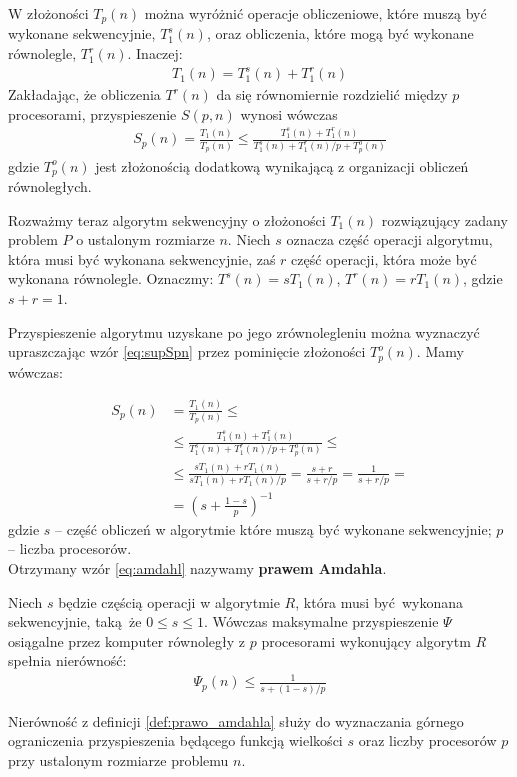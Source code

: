 W złożoności \(T_{p}(n)\) można wyróżnić operacje obliczeniowe, które muszą być wykonane sekwencyjnie, \(T^{s}_{1}(n)\), oraz obliczenia, które mogą być wykonane równolegle, \(T^{r}_{1}(n)\). Inaczej:
\begin{align}
T_{1}(n) = T^{s}_{1}(n) + T^{r}_{1}(n)
\end{align}
Zakładając, że obliczenia \(T^{r}(n)\) da się równomiernie rozdzielić między \(p\) procesorami, przyspieszenie \(S(p, n)\) wynosi wówczas
\begin{align}\label{eq:supSpn}
S_{p}(n) = \frac{T_{1}(n)}{T_{p}(n)}\leq\frac{T^{s}_{1}(n) + T^{r}_{1}(n)}{T^{s}_{1}(n) + T^{r}_{1}(n)/p + T^{o}_{p}(n)}
\end{align}
gdzie \(T^{o}_{p}(n)\) jest złożonością dodatkową wynikającą z organizacji obliczeń równoległych.


Rozważmy teraz algorytm sekwencyjny o złożoności \(T_{1}(n)\) rozwiązujący zadany problem \(P\) o ustalonym rozmiarze \(n\). Niech \(s\) oznacza część operacji algorytmu, która musi być wykonana sekwencyjnie, zaś \(r\) część operacji, która może być wykonana równolegle. Oznaczmy: \(T^{s}(n) = sT_{1}(n)\), \(T^{r}(n)=rT_{1}(n)\), gdzie \(s+r=1\). 


Przyspieszenie algorytmu uzyskane po jego zrównolegleniu można wyznaczyć upraszczając wzór \eqref{eq:supSpn} przez pominięcie złożoności \(T^{o}_{p}(n)\). Mamy wówczas:

\begin{equation}
\begin{split}\label{eq:amdahl}
S_{p}(n) &= \frac{T_{1}(n)}{T_{p}(n)}\leq\\
&\leq \frac{T^{s}_{1}(n) + T^{r}_{1}(n)}{T^{s}_{1}(n) + T^{r}_{1}(n)/p + T^{o}_{p}(n)}\leq\\
&\leq \frac{sT_{1}(n) + rT_{1}(n)}{sT_{1}(n) + rT_{1}(n)/p} = \frac{s+r}{s+r/p} = \frac{1}{s+r/p}= \\
&= \left(s+\frac{1-s}{p}\right)^{-1}
\end{split}
\end{equation}
gdzie \(s\) – część obliczeń w algorytmie które muszą być wykonane sekwencyjnie; \(p\) – liczba procesorów.\\
Otrzymany wzór \eqref{eq:amdahl} nazywamy \textbf{prawem Amdahla}. 


\begin{definicja}\label{def:prawo_amdahla}
Niech \(s\) będzie częścią operacji w algorytmie \(R\), która musi być wykonana sekwencyjnie, taką że \(0\leq s \leq 1\). Wówczas maksymalne przyspieszenie \(\Psi\) osiągalne przez komputer równoległy z \(p\) procesorami wykonujący algorytm \(R\) spełnia nierówność:
\begin{align}
\Psi_{p}(n) \leq \frac{1}{s+(1-s)/p}
\end{align}
\end{definicja}
\begin{uwaga}
Nierówność z definicji \ref{def:prawo_amdahla} służy do wyznaczania górnego ograniczenia przyspieszenia będącego funkcją wielkości \(s\) oraz liczby procesorów \(p\) przy ustalonym rozmiarze problemu \(n\).
\end{uwaga}

